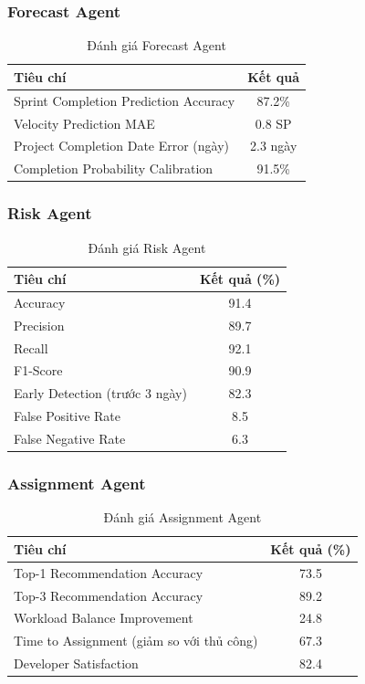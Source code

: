 \documentclass[12pt,a4paper]{report}
\begin{document}
\subsubsection{Forecast Agent}

\begin{table}[H]
\centering
\caption{Đánh giá Forecast Agent}
\begin{tabular}{|p{5cm}|c|}
\hline
\textbf{Tiêu chí} & \textbf{Kết quả} \\
\hline
Sprint Completion Prediction Accuracy & 87.2\% \\
\hline
Velocity Prediction MAE & 0.8 SP \\
\hline
Project Completion Date Error (ngày) & 2.3 ngày \\
\hline
Completion Probability Calibration & 91.5\% \\
\hline
\end{tabular}
\label{tab:forecast_agent_results}
\end{table}

\subsubsection{Risk Agent}

\begin{table}[H]
\centering
\caption{Đánh giá Risk Agent}
\begin{tabular}{|p{5cm}|c|}
\hline
\textbf{Tiêu chí} & \textbf{Kết quả (\%)} \\
\hline
Accuracy & 91.4 \\
\hline
Precision & 89.7 \\
\hline
Recall & 92.1 \\
\hline
F1-Score & 90.9 \\
\hline
Early Detection (trước 3 ngày) & 82.3 \\
\hline
False Positive Rate & 8.5 \\
\hline
False Negative Rate & 6.3 \\
\hline
\end{tabular}
\label{tab:risk_agent_results}
\end{table}

\subsubsection{Assignment Agent}

\begin{table}[H]
\centering
\caption{Đánh giá Assignment Agent}
\begin{tabular}{|p{5cm}|c|}
\hline
\textbf{Tiêu chí} & \textbf{Kết quả (\%)} \\
\hline
Top-1 Recommendation Accuracy & 73.5 \\
\hline
Top-3 Recommendation Accuracy & 89.2 \\
\hline
Workload Balance Improvement & 24.8 \\
\hline
Time to Assignment (giảm so với thủ công) & 67.3 \\
\hline
Developer Satisfaction & 82.4 \\
\hline
\end{tabular}
\label{tab:assignment_agent_results}
\end{table}
\end{document}
